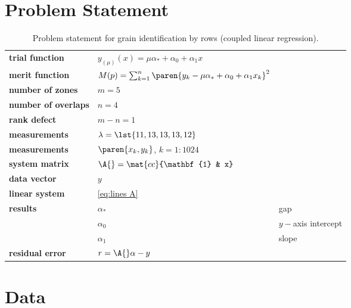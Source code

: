 \section{Problem Statement}  %

  \begin{table}[t]  %
    \caption{Problem statement for grain identification by rows (coupled linear regression).}
    \begin{center}
      \begin{tabular}{lll}
        \bf{trial function} & $y_{(\mu)}(x) = \mu \alpha_{*} + \alpha_{0} + \alpha_{1} x$ \\
        \bf{merit function} & $M(p) = \sum_{k=1}^{n}\paren{y_{k} - \mu \alpha_{*} + \alpha_{0} + \alpha_{1} x_{k}}^{2}$ \\
        \bf{number of zones}& $m = 5$ \\
        \bf{number of overlaps}& $n = 4$ \\
        \bf{rank defect}    & $m - n  = 1$ \\
        \bf{measurements}   & $\lambda = \lst{11, 13, 13, 13, 12}$ \\
        \bf{measurements}   & $\paren{x_{k}, y_{k}}$, $k=1\colon 1024$ \\
        \bf{system matrix}  & $\A{} = \mat{cc}{\mathbf{1} & x}$ \\
        \bf{data vector}    & $y$ \\
        \bf{linear system}  & \eqref{eq:lines A} \\
        
        \bf{results}        & $\alpha_{*}$ & gap\\
                            & $\alpha_{0}$ & $y-$axis intercept\\
                            & $\alpha_{1}$ & slope\\
        \bf{residual error} & $r = \A{} \alpha - y$ \\
      \end{tabular}
    \end{center}
  \label{tab:find lines problem statement}
  \end{table}%

\section{Data} %
  
